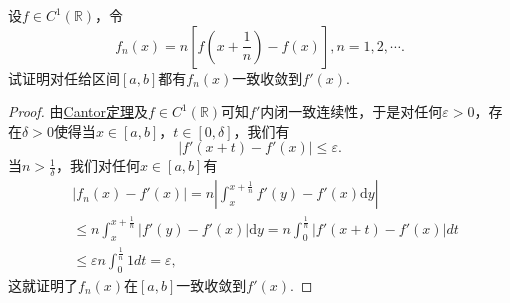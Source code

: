 \documentclass[../../main.tex]{subfiles}
\begin{document}
\begin{example}
设\(f \in C^1(\mathbb{R})\)，令
\[
f_n(x) = n \left[ f \left( x + \frac{1}{n} \right) - f(x) \right], n = 1, 2, \cdots.
\]
试证明对任给区间\([a, b]\)都有\(f_n(x)\)一致收敛到\(f'(x)\).
\end{example}
\begin{proof}
由\hyperref[theorem:Cantor定理]{Cantor定理}及\(f \in C^1(\mathbb{R})\)可知\(f'\)内闭一致连续性，于是对任何\(\varepsilon > 0\)，存在\(\delta > 0\)使得当\(x \in [a, b]\)，\(t \in [0, \delta]\)，我们有
\[
|f'(x + t) - f'(x)| \leqslant \varepsilon.
\]
当\(n > \frac{1}{\delta}\)，我们对任何\(x \in [a, b]\)有
\begin{align*}
&|f_n(x) - f'(x)| = n \left| \int_{x}^{x + \frac{1}{n}} f'(y) - f'(x) \mathrm{d}y \right| \\
&\leqslant n \int_{x}^{x + \frac{1}{n}} |f'(y) - f'(x)| \mathrm{d}y = n \int_{0}^{\frac{1}{n}} |f'(x + t) - f'(x)| dt \\
&\leqslant \varepsilon n \int_{0}^{\frac{1}{n}} 1 dt = \varepsilon,
\end{align*}
这就证明了\(f_n(x)\)在\([a, b]\)一致收敛到\(f'(x)\).
\end{proof}
\end{document}

